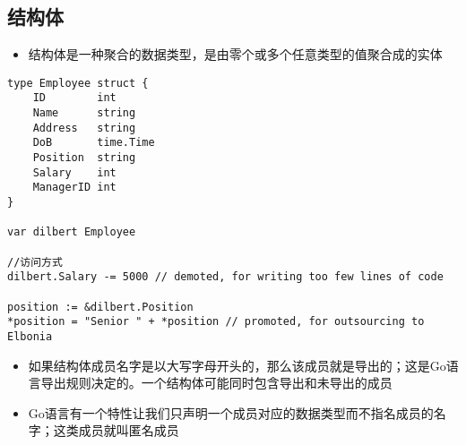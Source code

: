 \hypertarget{ux7ed3ux6784ux4f53}{%
\subsection{结构体}\label{ux7ed3ux6784ux4f53}}

\begin{itemize}
\tightlist
\item
  结构体是一种聚合的数据类型，是由零个或多个任意类型的值聚合成的实体
\end{itemize}

\begin{verbatim}
type Employee struct {
    ID        int
    Name      string
    Address   string
    DoB       time.Time
    Position  string
    Salary    int
    ManagerID int
}

var dilbert Employee

//访问方式
dilbert.Salary -= 5000 // demoted, for writing too few lines of code

position := &dilbert.Position
*position = "Senior " + *position // promoted, for outsourcing to Elbonia

\end{verbatim}

\begin{itemize}
\tightlist
\item
  如果结构体成员名字是以大写字母开头的，那么该成员就是导出的；这是Go语言导出规则决定的。一个结构体可能同时包含导出和未导出的成员
\item
  Go语言有一个特性让我们只声明一个成员对应的数据类型而不指名成员的名字；这类成员就叫匿名成员
\end{itemize}

\begin{Shaded}
\begin{Highlighting}[]

\NormalTok{ (}
\NormalTok{)}

\NormalTok{ \{}
\NormalTok{\}}

\NormalTok{ \{}
 
\NormalTok{\}}


\NormalTok{\}}
\end{Highlighting}
\end{Shaded}

